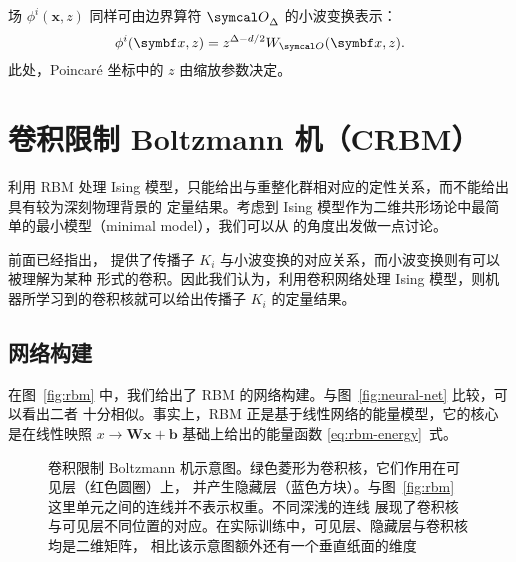 场 $\phi^i(\bm{x},z)$ 同样可由边界算符 $\opO_\Delta$ 的小波变换表示：
\begin{equation}
  \phi^i(\bm{x},z) = z^{\Delta-d/2} W_{\opO}(\bm{x},z).
\end{equation}
此处，Poincaré 坐标中的 $z$ 由缩放参数决定。

\section{卷积限制 Boltzmann 机（CRBM）}

利用 RBM 处理 Ising 模型，只能给出与重整化群相对应的定性关系，而不能给出具有较为深刻物理背景的
定量结果。考虑到 Ising 模型作为二维共形场论中最简单的最小模型（minimal model），我们可以从
\AdSCFT{} 的角度出发做一点讨论。

前面已经指出，\AdSCFT{} 提供了传播子 $K_i$ 与小波变换的对应关系，而小波变换则有可以被理解为某种
形式的卷积。因此我们认为，利用卷积网络处理 Ising 模型，则机器所学习到的卷积核就可以给出传播子
$K_i$ 的定量结果。

\subsection{网络构建}

在图~\ref{fig:rbm} 中，我们给出了 RBM 的网络构建。与图~\ref{fig:neural-net} 比较，可以看出二者
十分相似。事实上，RBM 正是基于线性网络的能量模型，它的核心是在线性映照 $x\to\bm{W}\bm{x}+\bm{b}$
基础上给出的能量函数 \eqref{eq:rbm-energy}~式。

\begin{figure}[htb]
  \centering
  \caption{卷积限制 Boltzmann 机示意图。绿色菱形为卷积核，它们作用在可见层（红色圆圈）上，
    并产生隐藏层（蓝色方块）。与图~\ref{fig:rbm} 这里单元之间的连线并不表示权重。不同深浅的连线
    展现了卷积核与可见层不同位置的对应。在实际训练中，可见层、隐藏层与卷积核均是二维矩阵，
    相比该示意图额外还有一个垂直纸面的维度}
  \label{fig:crbm}
\end{figure}

